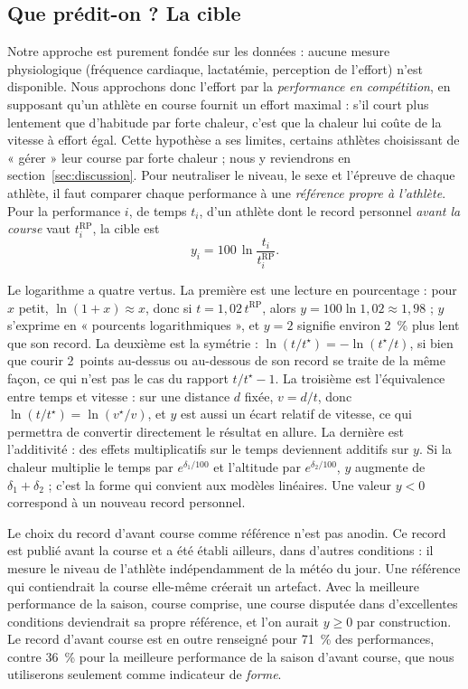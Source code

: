 \documentclass[11pt,a4paper]{article}
\newcommand{\RP}{\mathrm{RP}}
\begin{document}
\subsection{Que prédit-on ? La cible}\label{sec:cible}

Notre approche est purement fondée sur les données : aucune mesure physiologique (fréquence cardiaque, lactatémie,
perception de l'effort) n'est disponible. Nous approchons donc l'effort par la \emph{performance en compétition}, en
supposant qu'un athlète en course fournit un effort maximal : s'il court plus lentement que d'habitude par forte
chaleur, c'est que la chaleur lui coûte de la vitesse à effort égal. Cette hypothèse a ses limites, certains athlètes
choisissant de « gérer » leur course par forte chaleur ; nous y reviendrons en section~\ref{sec:discussion}. Pour
neutraliser le niveau, le sexe et l'épreuve de chaque athlète, il faut comparer chaque performance à une
\emph{référence propre à l'athlète}. Pour la performance $i$, de temps $t_i$, d'un athlète dont le record personnel
\emph{avant la course} vaut $t_i^{\RP}$, la cible est
\begin{equation}\label{eq:cible}
y_i = 100\,\ln\frac{t_i}{t_i^{\RP}} .
\end{equation}

Le logarithme a quatre vertus. La première est une lecture en pourcentage : pour $x$ petit,
$\ln(1 + x) \approx x$, donc si $t = 1{,}02\,t^{\RP}$, alors $y = 100 \ln 1{,}02 \approx 1{,}98$ ; $y$ s'exprime en
« pourcents logarithmiques », et $y = 2$ signifie environ 2~\% plus lent que son record. La deuxième est la
symétrie : $\ln(t/t^\star) = -\ln(t^\star/t)$, si bien que courir 2~points au-dessus ou au-dessous de son record se
traite de la même façon, ce qui n'est pas le cas du rapport $t/t^\star - 1$. La troisième est l'équivalence entre
temps et vitesse : sur une distance $d$ fixée, $v = d/t$, donc $\ln(t/t^\star) = \ln(v^\star/v)$, et $y$ est aussi
un écart relatif de vitesse, ce qui permettra de convertir directement le résultat en allure. La dernière est
l'additivité : des effets multiplicatifs sur le temps deviennent additifs sur $y$. Si la chaleur multiplie le temps
par $e^{\delta_1/100}$ et l'altitude par $e^{\delta_2/100}$, $y$ augmente de $\delta_1 + \delta_2$ ; c'est la forme
qui convient aux modèles linéaires. Une valeur $y < 0$ correspond à un nouveau record personnel.

Le choix du record d'avant course comme référence n'est pas anodin. Ce record est publié avant la course et a été
établi ailleurs, dans d'autres conditions : il mesure le niveau de l'athlète indépendamment de la météo du jour. Une
référence qui contiendrait la course elle-même créerait un artefact. Avec la meilleure performance de la saison,
course comprise, une course disputée dans d'excellentes conditions deviendrait sa propre référence, et l'on aurait
$y \geq 0$ par construction. Le record d'avant course est en outre renseigné pour 71~\% des performances, contre
36~\% pour la meilleure performance de la saison d'avant course, que nous utiliserons seulement comme indicateur de
\emph{forme}.
\end{document}
